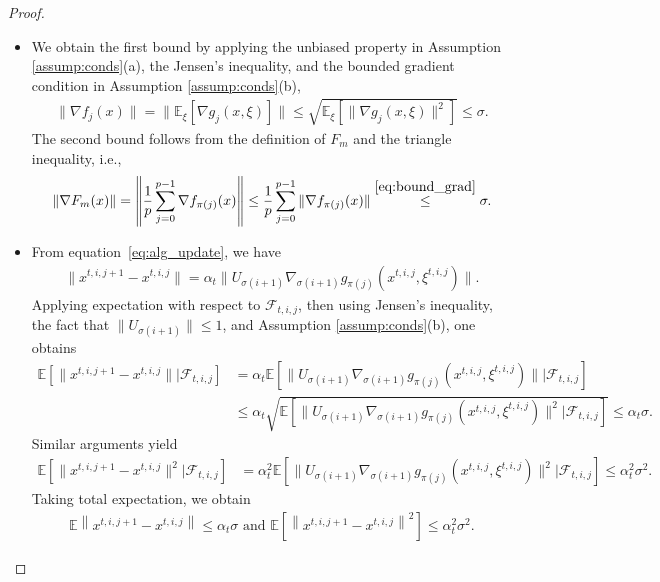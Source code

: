 \documentclass[10pt,a4paper]{amsart}
\newcommand{\Fm}{F_m}
\begin{document}
\begin{proof} 
\begin{itemize}
\item[(a)] We obtain the first bound by applying the unbiased property in Assumption \ref{assump:conds}(a), the Jensen's inequality, and the bounded gradient condition in Assumption \ref{assump:conds}(b),
\begin{align}\label{eq:bound_grad}
    \|\nabla f_j(x)\| =  \|\mathbb{E}_{\xi} \left[\nabla g_j(x,\xi)\right]\| \leq \sqrt{ \mathbb{E}_{\xi} \left[\|\nabla g_j(x,\xi)\|^2\right]} \leq \sigma.
\end{align}
The second bound follows from the definition of $\Fm$ and the triangle inequality, i.e.,
\begin{align*}
    \|\nabla \Fm(x)\| =  \left\|\frac{1}{p}\sum_{j=0}^{p-1}\nabla f_{\pi(j)} (x)\right\| \leq \frac{1}{p}\sum_{j=0}^{p-1}\|\nabla f_{\pi(j)} (x)\| \overset{\eqref{eq:bound_grad}}{\leq} \sigma.
\end{align*}
\item[(b)] 
From equation~\eqref{eq:alg_update}, we have 
\begin{align*}
    \|x^{t,i,j+1} - x^{t,i,j}\| = \alpha_t \| U_{\sigma(i+1)} \nabla_{\sigma(i+1)} g_{\pi(j)} (x^{t,i,j}, \xi^{t,i,j})\|.
\end{align*}
Applying expectation with respect to $\mathcal{F}_{t,i,j}$, then using Jensen's inequality, the fact that $\| U_{\sigma(i+1)}\| \leq 1$, and Assumption \ref{assump:conds}(b), one obtains 
\begin{align*}
    \mathbb{E} [\|x^{t,i,j+1} - x^{t,i,j}\|  | \mathcal{F}_{t,i,j}]&= \alpha_t  \mathbb{E} [\| U_{\sigma(i+1)} \nabla_{\sigma(i+1)} g_{\pi(j)} (x^{t,i,j}, \xi^{t,i,j})\|| \mathcal{F}_{t,i,j}]\\
    &\leq \alpha_t  \sqrt{\mathbb{E} [\| U_{\sigma(i+1)} \nabla_{\sigma(i+1)} g_{\pi(j)} (x^{t,i,j}, \xi^{t,i,j})\|^2| \mathcal{F}_{t,i,j}]} \leq \alpha_t \sigma.
\end{align*}
Similar arguments yield
\begin{align*}
    \mathbb{E} [\|x^{t,i,j+1} - x^{t,i,j}\|^2  | \mathcal{F}_{t,i,j}]&= \alpha_t^2  \mathbb{E} [\| U_{\sigma(i+1)} \nabla_{\sigma(i+1)} g_{\pi(j)} (x^{t,i,j}, \xi^{t,i,j})\|^2| \mathcal{F}_{t,i,j}]\leq \alpha_t^2 \sigma^2.
\end{align*}
Taking total expectation, we obtain
\begin{align*}
    \mathbb{E} \left\|x^{t,i,j+1}-x^{t,i,j}\right\| \leq \alpha_t \sigma \text{ and }
    \mathbb{E} \left[\left\|x^{t,i,j+1}-x^{t,i,j}\right\|^2\right] \leq \alpha_t^2 \sigma^2.
\end{align*}
\end{itemize} 
\end{proof}
\end{document}
